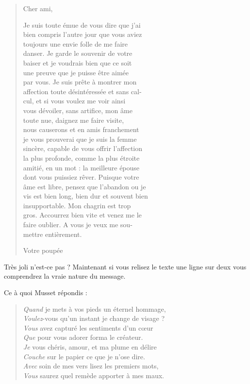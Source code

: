 \documentclass[a4paper,12pt]{article}
\begin{document}
\begin{verse}
  Cher ami,

  Je suis toute émue de vous dire que j'ai\\
  bien compris l'autre jour que vous aviez\\
  toujours une envie folle de me faire\\
  danser. Je garde le souvenir de votre\\
  baiser et je voudrais bien que ce soit\\
  une preuve que je puisse être aimée\\
  par vous. Je suis prête à montrer mon\\
  affection toute désintéressée et sans cal-\\
  cul, et si vous voulez me voir ainsi\\
  vous dévoiler, sans artifice, mon âme\\
  toute nue, daignez me faire visite,\\
  nous causerons et en amis franchement\\
  je vous prouverai que je suis la femme\\
  sincère, capable de vous offrir l'affection\\
  la plus profonde, comme la plus étroite\\
  amitié, en un mot : la meilleure épouse\\
  dont vous puissiez rêver. Puisque votre\\
  âme est libre, pensez que l'abandon ou je\\
  vis est bien long, bien dur et souvent bien\\
  insupportable. Mon chagrin est trop\\
  gros. Accourrez bien vite et venez me le\\
  faire oublier. A vous je veux me sou-\\
  mettre entièrement.

  Votre poupée
\end{verse}

Très joli n'est-ce pas ? Maintenant si vous relisez le texte une ligne sur deux vous comprendrez la vraie nature du message.

Ce à quoi Musset répondis :

\begin{verse}
  \emph{Quand} je mets à vos pieds un éternel hommage,\\
  \emph{Voulez}-vous qu'un instant je change de visage ?\\
  \emph{Vous} avez capturé les sentiments d'un c\oe{}ur\\
  \emph{Que} pour vous adorer forma le créateur.\\
  \emph{Je} vous chéris, amour, et ma plume en délire\\
  \emph{Couche} sur le papier ce que je n'ose dire.\\
  \emph{Avec} soin de mes vers lisez les premiers mots,\\
  \emph{Vous} saurez quel remède apporter à mes maux. \\
\end{verse}
\end{document}
